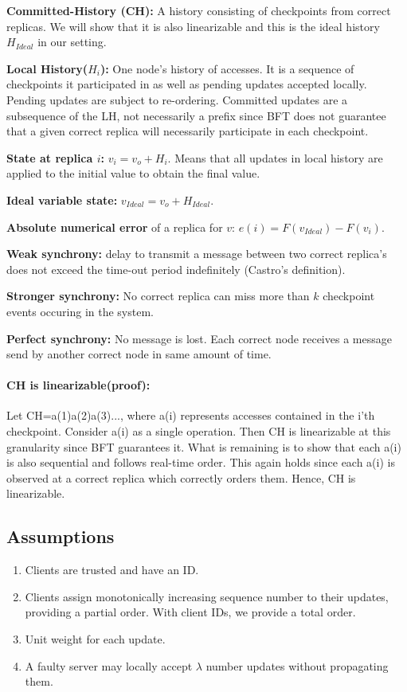\documentclass[letterpaper,twocolumn,10pt]{article}
\begin{document}
\textbf{Committed-History (CH):} A history consisting of checkpoints
from correct replicas. We will show that it is also linearizable
and this is the ideal history $H_{Ideal}$ in our setting.

\textbf{Local History($H_{i}$):} One node's history of accesses. It is a
sequence of checkpoints it participated in as well as pending updates
accepted locally. Pending updates are subject to re-ordering.
Committed updates are a subsequence of the LH, not necessarily
a prefix since BFT does not guarantee that a given correct replica
will necessarily participate in each checkpoint.

\textbf{State at replica $i$:} $v_{i} = v_{o} + H_{i}$. Means that all
updates in local history are applied to the initial value to obtain
the final value.

\textbf{Ideal variable state:} $v_{Ideal} = v_{o} + H_{Ideal}$.

\textbf{Absolute numerical error} of a replica for $v$: $e(i) = F(v_{Ideal}) - F(v_{i})$.

\textbf{Weak synchrony:} delay to transmit a message between two
correct replica's does not exceed the
time-out period indefinitely (Castro's definition).

\textbf{Stronger synchrony:} No correct replica can miss more than $k$
checkpoint events occuring in the system.

\textbf{Perfect synchrony:} No message is lost. Each correct node receives
a message send by another correct node in same amount of time.

\paragraph{CH is linearizable(proof):} Let CH=a(1)a(2)a(3)..., where
a(i) represents accesses contained in the i'th checkpoint. 
Consider a(i) as a single operation. Then CH is linearizable at this
granularity since BFT guarantees it. What is remaining is to show that
each a(i) is also sequential and follows real-time order. This again
holds since each a(i) is observed at a correct replica which correctly
orders them. Hence, CH is linearizable.

\subsection{Assumptions}

\begin{enumerate}
\item{} Clients are trusted and have an ID.
\item{} Clients assign monotonically increasing sequence
number to their updates, providing a partial
order. With client IDs, we provide a total order.
\item{} Unit weight for each update.
\item{} A faulty server may locally accept $\lambda$ number 
updates without propagating them.
\end{enumerate}
\end{document}
